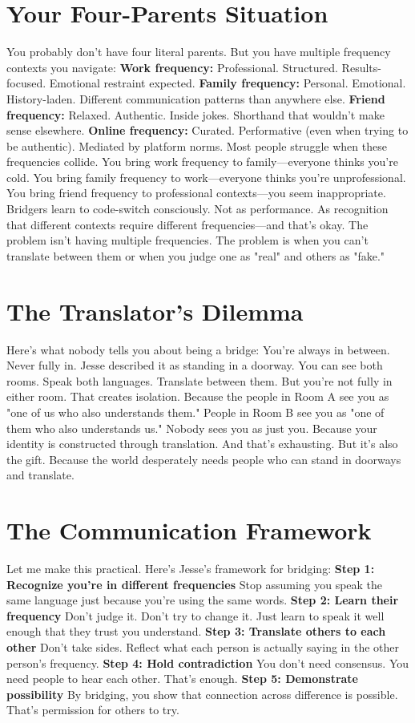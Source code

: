 \section{Your Four-Parents Situation}

You probably don't have four literal parents. But you have multiple frequency contexts you navigate:
\textbf{Work frequency:} Professional. Structured. Results-focused. Emotional restraint expected.
\textbf{Family frequency:} Personal. Emotional. History-laden. Different communication patterns than anywhere else.
\textbf{Friend frequency:} Relaxed. Authentic. Inside jokes. Shorthand that wouldn't make sense elsewhere.
\textbf{Online frequency:} Curated. Performative (even when trying to be authentic). Mediated by platform norms.
Most people struggle when these frequencies collide.
You bring work frequency to family—everyone thinks you're cold. You bring family frequency to work—everyone thinks you're unprofessional. You bring friend frequency to professional contexts—you seem inappropriate.
Bridgers learn to code-switch consciously.
Not as performance. As recognition that different contexts require different frequencies—and that's okay.
The problem isn't having multiple frequencies. The problem is when you can't translate between them or when you judge one as "real" and others as "fake."

\section{The Translator's Dilemma}

Here's what nobody tells you about being a bridge:
You're always in between. Never fully in.
Jesse described it as standing in a doorway. You can see both rooms. Speak both languages. Translate between them.
But you're not fully in either room.
That creates isolation. Because the people in Room A see you as "one of us who also understands them." People in Room B see you as "one of them who also understands us."
Nobody sees you as just you. Because your identity is constructed through translation.
And that's exhausting. But it's also the gift.
Because the world desperately needs people who can stand in doorways and translate.

\section{The Communication Framework}

Let me make this practical. Here's Jesse's framework for bridging:
\textbf{Step 1: Recognize you're in different frequencies}
Stop assuming you speak the same language just because you're using the same words.
\textbf{Step 2: Learn their frequency}
Don't judge it. Don't try to change it. Just learn to speak it well enough that they trust you understand.
\textbf{Step 3: Translate others to each other}
Don't take sides. Reflect what each person is actually saying in the other person's frequency.
\textbf{Step 4: Hold contradiction}
You don't need consensus. You need people to hear each other. That's enough.
\textbf{Step 5: Demonstrate possibility}
By bridging, you show that connection across difference is possible. That's permission for others to try.

